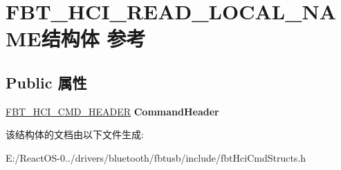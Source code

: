 \hypertarget{struct_f_b_t___h_c_i___r_e_a_d___l_o_c_a_l___n_a_m_e}{}\section{F\+B\+T\+\_\+\+H\+C\+I\+\_\+\+R\+E\+A\+D\+\_\+\+L\+O\+C\+A\+L\+\_\+\+N\+A\+M\+E结构体 参考}
\label{struct_f_b_t___h_c_i___r_e_a_d___l_o_c_a_l___n_a_m_e}
\subsection*{Public 属性}
\begin{DoxyCompactItemize}
\item 
\mbox{\label{struct_f_b_t___h_c_i___r_e_a_d___l_o_c_a_l___n_a_m_e_ad9c28727f97fccfc71f5a2bf2b614bd5}} 
\hyperlink{struct_f_b_t___h_c_i___c_m_d___h_e_a_d_e_r}{F\+B\+T\+\_\+\+H\+C\+I\+\_\+\+C\+M\+D\+\_\+\+H\+E\+A\+D\+ER} {\bfseries Command\+Header}
\end{DoxyCompactItemize}


该结构体的文档由以下文件生成\+:\begin{DoxyCompactItemize}
\item 
E\+:/\+React\+O\+S-\/0../drivers/bluetooth/fbtusb/include/fbt\+Hci\+Cmd\+Structs.\+h\end{DoxyCompactItemize}
